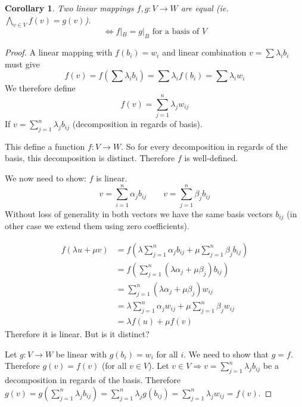 \documentclass[a4paper,landscape,twocolumn]{article}
\newtheorem{cor}{Corollary}
\begin{document}
\begin{cor}
  Two linear mappings $f,g: V \rightarrow W$ are equal (ie. $\bigwedge_{v \in V} f(v) = g(v)$).
  \[ \Leftrightarrow f|_B = g|_B \text{ for a basis of } V \]
\end{cor}
\begin{proof}
  A linear mapping with $f(b_i) = w_i$ and linear combination $v = \sum \lambda_i b_i$ must give
  \[ f(v) = f\left(\sum \lambda_i b_i\right) = \sum \lambda_i f(b_i) = \sum \lambda_i w_i \]
  We therefore define
  \[ f(v) = \sum_{j=1}^n \lambda_j w_{ij} \]
  If $v = \sum_{j=1}^n \lambda_j b_{ij}$ (decomposition in regards of basis).

  This define a function $f: V \rightarrow W$. So for every decomposition in regards of the basis,
  this decomposition is distinct. Therefore $f$ is well-defined.

  We now need to show: $f$ is linear.
  \[ v = \sum_{i=1}^n \alpha_j b_{ij} \qquad v = \sum_{j=1}^n \beta_j b_{ij} \]
  Without loss of generality in both vectors we have the same basis vectors $b_{ij}$
  (in other case we extend them using zero coefficients).

  \begin{align*}
    f(\lambda u + \mu v) &= f(\lambda \sum_{j=1}^n \alpha_j b_{ij} + \mu \sum_{j=1}^n \beta_j b_{ij}) \\
      &= f(\sum_{j=1}^n \left(\lambda \alpha_j + \mu \beta_j\right) b_{ij}) \\
      &= \sum_{j=1}^n \left(\lambda \alpha_j + \mu \beta_j\right) w_{ij} \\
      &= \lambda \sum_{j=1}^n \alpha_j w_{ij} + \mu \sum_{j=1}^n \beta_j w_{ij} \\
      &= \lambda f(u) + \mu f(v)
  \end{align*}
  Therefore it is linear. But is it distinct?

  Let $g: V \rightarrow W$ be linear with $g(b_i) = w_i$ for all $i$.
  We need to show that $g = f$. Therefore $g(v) = f(v)$ (for all $v \in V$).
  Let $v \in V \Rightarrow v = \sum_{j=1}^n \lambda_j b_{ij}$ be a decomposition
  in regards of the basis. Therefore $g(v) = g\left(\sum_{j=1}^n \lambda_j b_{ij}\right)
  = \sum_{j=1}^n \lambda_j g(b_{ij}) = \sum_{j=1}^n \lambda_j w_{ij} = f(v)$.
\end{proof}
\end{document}
